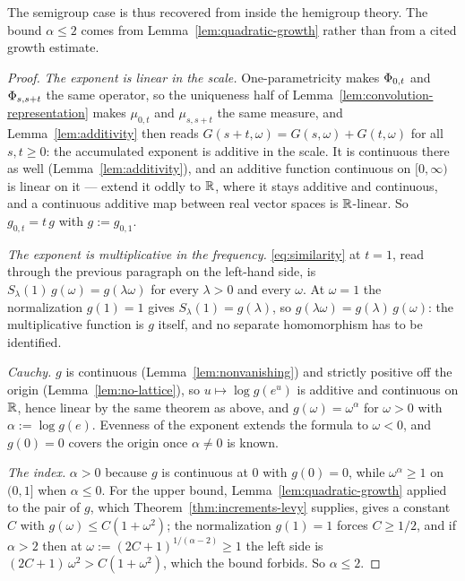 The semigroup case is thus recovered from inside the hemigroup theory. The bound
$\alpha \le 2$ comes from Lemma~\ref{lem:quadratic-growth} rather than from a cited growth estimate.

\begin{proof}
\emph{The exponent is linear in the scale.} One-parametricity makes $\Phi_{0,t}$ and
$\Phi_{s,s+t}$ the same operator, so the uniqueness half of
Lemma~\ref{lem:convolution-representation} makes $\mu_{0,t}$ and $\mu_{s,s+t}$ the same
measure, and Lemma~\ref{lem:additivity} then reads $G(s+t,\omega) = G(s,\omega) + G(t,\omega)$
for all $s,t \ge 0$: the accumulated exponent is additive in the scale. It is continuous
there as well (Lemma~\ref{lem:additivity}), and an additive function continuous on
$[0,\infty)$ is linear on it --- extend it oddly to $\mathbb{R}$, where it stays additive and
continuous, and a continuous additive map between real vector spaces is $\mathbb{R}$-linear. So
$g_{0,t} = t\,g$ with $g := g_{0,1}$.

\emph{The exponent is multiplicative in the frequency.} \ref{eq:similarity} at $t = 1$, read
through the previous paragraph on the left-hand side, is
$S_\lambda(1)\,g(\omega) = g(\lambda\omega)$ for every $\lambda > 0$ and every $\omega$. At
$\omega = 1$ the normalization $g(1) = 1$ gives $S_\lambda(1) = g(\lambda)$, so
$g(\lambda\omega) = g(\lambda)\,g(\omega)$: the multiplicative function is $g$ itself, and no
separate homomorphism has to be identified.

\emph{Cauchy.} $g$ is continuous (Lemma~\ref{lem:nonvanishing}) and strictly positive off the
origin (Lemma~\ref{lem:no-lattice}), so $u \mapsto \log g(e^u)$ is additive and continuous on
$\mathbb{R}$, hence linear by the same theorem as above, and $g(\omega) = \omega^\alpha$ for
$\omega > 0$ with $\alpha := \log g(e)$. Evenness of the exponent extends the formula to
$\omega < 0$, and $g(0) = 0$ covers the origin once $\alpha \ne 0$ is known.

\emph{The index.} $\alpha > 0$ because $g$ is continuous at $0$ with $g(0) = 0$, while
$\omega^\alpha \ge 1$ on $(0,1]$ when $\alpha \le 0$. For the upper bound,
Lemma~\ref{lem:quadratic-growth} applied to the \Levy{} pair of $g$, which
Theorem~\ref{thm:increments-levy} supplies, gives a constant $C$ with
$g(\omega) \le C(1+\omega^2)$; the normalization $g(1) = 1$ forces $C \ge 1/2$, and if
$\alpha > 2$ then at $\omega := (2C+1)^{1/(\alpha-2)} \ge 1$ the left side is
$(2C+1)\,\omega^2 > C(1+\omega^2)$, which the bound forbids. So $\alpha \le 2$.


\end{proof}
